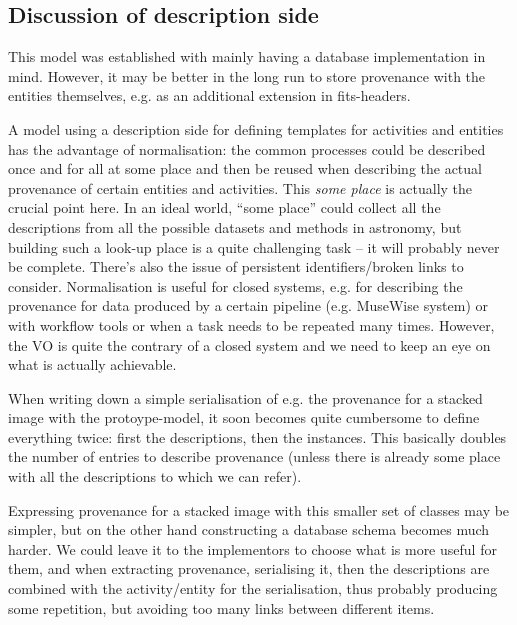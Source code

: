 
\subsection{Discussion of description side}
This model was established with mainly having a database implementation in mind. 
However, it may be better in the long run to store provenance with 
the entities themselves, e.g. as an additional extension in fits-headers.

A model using a description side for defining templates for activities and
entities has the advantage of normalisation: the common processes could be 
described once and for all at some place and then be reused when describing 
the actual provenance of certain entities and activities. This \emph{some place} 
is actually the crucial point here.
In an ideal world, ``some place'' could collect all the descriptions from all 
the possible datasets and methods in astronomy, but building such a look-up place 
is a quite challenging task -- it will probably never be complete. There's also 
the issue of persistent identifiers/broken links to consider.
Normalisation is useful for closed systems, e.g. for describing the provenance 
for data produced by a certain pipeline (e.g. MuseWise system) or with 
workflow tools or when a task needs to be repeated many times. However, the VO 
is quite the contrary of a closed system and we need to keep an eye on what is 
actually achievable.

When writing down a simple serialisation of e.g. the provenance for a stacked 
image with the protoype-model, it soon becomes quite cumbersome to define 
everything twice: first the descriptions, then the instances. This basically 
doubles the number of entries to describe provenance (unless there is already 
some place with all the descriptions to which we can refer).

Expressing provenance for a stacked image with this smaller set of classes may 
be simpler, but on the other hand constructing a database schema becomes much 
harder. 
We could leave it to the implementors to choose what is more useful for them, 
and when extracting provenance, serialising it, then the descriptions are 
combined with the activity/entity for 
the serialisation, thus probably producing some repetition, but avoiding too 
many links between different items.

